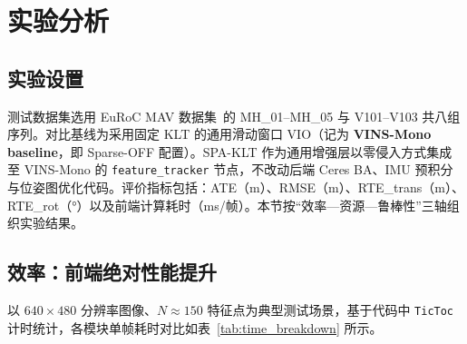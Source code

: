 \documentclass[letterpaper,journal]{IEEEtran}
\begin{document}
\section{实验分析}
\label{sec:experiment}

\subsection{实验设置}
测试数据集选用 EuRoC MAV 数据集~\cite{burri2016euroc}的 MH\_01--MH\_05 与 V101--V103 共八组序列。对比基线为采用固定 KLT 的通用滑动窗口 VIO（记为 \textbf{VINS-Mono baseline}，即 Sparse-OFF 配置）。SPA-KLT 作为通用增强层以零侵入方式集成至 VINS-Mono 的 \texttt{feature\_tracker} 节点，不改动后端 Ceres BA、IMU 预积分与位姿图优化代码。评价指标包括：ATE（m）、RMSE（m）、RTE\_trans（m）、RTE\_rot（°）以及前端计算耗时（ms/帧）。本节按``效率—资源—鲁棒性''三轴组织实验结果。

\subsection{效率：前端绝对性能提升}
以 $640\times480$ 分辨率图像、$N\approx150$ 特征点为典型测试场景，基于代码中 \texttt{TicToc} 计时统计，各模块单帧耗时对比如表~\ref{tab:time_breakdown} 所示。

\begin{table}[!t]
\centering
\caption{前端 feature\_tracker 各阶段单帧耗时对比（$640\times480$，$N\approx150$，单位：$\mathrm{ms}$，当前平台实测）。}
\label{tab:time_breakdown}
\end{table}
\end{document}

